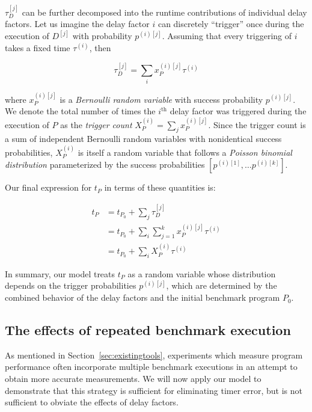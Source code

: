 \documentclass[conference]{IEEEtran}
\begin{document}
$\tau^{[j]}_D$ can be further decomposed into the runtime contributions of individual delay
factors. Let us imagine the delay factor $i$ can discretely ``trigger'' once during the
execution of $D^{[j]}$ with probability $p^{(i)[j]}$. Assuming that every triggering of $i$
takes a fixed time $\tau^{(i)}$, then

\begin{equation}
    \tau^{[j]}_D = \sum_{i} x_P^{(i)[j]} \tau^{(i)}
\end{equation}

where $x_P^{(i)[j]}$ is a \textit{Bernoulli random variable} with success probability
$p^{(i)[j]}$. We denote the total number of times the $i^{\textrm{th}}$ delay factor was
triggered during the execution of $P$ as the \textit{trigger count} $X_P^{(i)} = \sum_{j}
x_P^{(i)[j]}$. Since the trigger count is a sum of independent Bernoulli random variables with
nonidentical success probabilities, $X_P^{(i)}$ is itself a random variable that follows a
\textit{Poisson binomial distribution} parameterized by the success probabilities
$\left[p^{(i)[1]}, \dots p^{(i)[k]}\right]$.

Our final expression for $t_P$ in terms of these quantities is:

\begin{align}
t_P &= t_{P_0} + \sum_{j} \tau^{[j]}_D \\ \nonumber
    &= t_{P_0} + \sum_{i} \sum_{j=1}^{k} x_P^{(i)[j]} \tau^{(i)} \\ \nonumber
    &= t_{P_0} + \sum_{i} X_P^{(i)} \tau^{(i)}
\end{align}

In summary, our model treats $t_P$ as a random variable whose distribution depends on the
trigger probabilities $p^{(i)[j]}$, which are determined by the combined behavior of the
delay factors and the initial benchmark program $P_0$.

\subsection{The effects of repeated benchmark execution}
\label{sec:measuremodel}

As mentioned in Section~\ref{sec:existingtools}, experiments which measure program
performance often incorporate multiple benchmark executions in an attempt to obtain more
accurate measurements. We will now apply our model to demonstrate that this strategy is
sufficient for eliminating timer error, but is not sufficient to obviate the effects of
delay factors.
\end{document}
